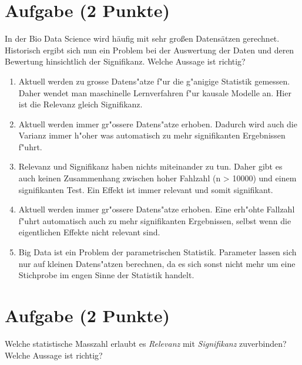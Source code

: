 \documentclass[a4paper, 10pt]{scrartcl}\usepackage[]{graphicx}\usepackage[]{xcolor}
\begin{document}
\section{Aufgabe \hfill (2 Punkte)}

In der Bio Data Science wird h{\"a}ufig mit sehr gro{\ss}en Datens{\"a}tzen
gerechnet. Historisch ergibt sich nun ein Problem bei der Auswertung der
Daten und deren Bewertung hinsichtlich der Signifikanz. Welche Aussage ist richtig?



\begin{enumerate}
\item [\textbf{A} \msquare] Aktuell werden zu grosse Datens{"a}tze f{"u}r die g{"a}nigige Statistik gemessen. Daher wendet man maschinelle Lernverfahren f{"u}r kausale Modelle an. Hier ist die Relevanz gleich Signifikanz.
\item [\textbf{B} \msquare] Aktuell werden immer gr{"o}ssere Datens{"a}tze erhoben. Dadurch wird auch die Varianz immer h{"o}her was automatisch zu mehr signifikanten Ergebnissen f{"u}hrt.
\item [\textbf{C} \msquare] Relevanz und Signifikanz haben nichts miteinander zu tun. Daher gibt es auch keinen Zusammenhang zwischen hoher Fahlzahl (n > 10000) und einem signifikanten Test. Ein Effekt ist immer relevant und somit signifikant.
\item [\textbf{D} \msquare] Aktuell werden immer gr{"o}ssere Datens{"a}tze erhoben. Eine erh{"o}hte Fallzahl f{"u}hrt automatisch auch zu mehr signifikanten Ergebnissen, selbst wenn die eigentlichen Effekte nicht relevant sind.
\item [\textbf{E} \msquare] Big Data ist ein Problem der parametrischen Statistik. Parameter lassen sich nur auf kleinen Datens{"a}tzen berechnen, da es sich sonst nicht mehr um eine Stichprobe im engen Sinne der Statistik handelt.
\end{enumerate}

\section{Aufgabe \hfill (2 Punkte)}

Welche statistische Masszahl erlaubt es \textit{Relevanz} mit
\textit{Signifikanz} zuverbinden? Welche Aussage ist richtig?
\end{document}
